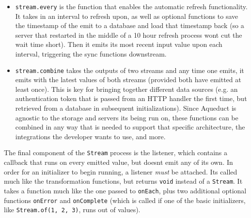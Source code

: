 \documentclass[manuscript,review,anonymous]{acmart}
\begin{document}
\begin{itemize}
  \begin{itemize}
  \tightlist
  \item
    Adding a \texttt{console.log} that prints on each event is essential
    while debugging if something in the chain is going wrong.
  \item
    If a developer wants to keep an external source up to date about
    things going on inside the chain, they can do it in an
    \texttt{onEach}. For example, a developer could add an
    \texttt{onEach} step after a login token has been exchanged, but
    before it\textquotesingle s been used for a web request, that saves
    it to a database (so that if the server were to restart, the user
    wouldn\textquotesingle t have to log back in).
  \end{itemize}
\item
  \texttt{stream.every} is the function that enables the automatic
  refresh functionality. It takes in an interval to refresh upon, as
  well as optional functions to save the timestamp of the emit to a
  database and load that timestamp back (so a server that restarted in
  the middle of a 10 hour refresh process won\textquotesingle t cut the
  wait time short). Then it emits its most recent input value upon each
  interval, triggering the sync functions downstream.
\item
  \texttt{stream.combine} takes the outputs of two streams and any time
  one emits, it emits with the latest values of both streams (provided
  both have emitted at least once). This is key for bringing together
  different data sources (e.g. an authentication token that is passed
  from an HTTP handler the first time, but retrieved from a database in
  subsequent initializations). Since Aqueduct is agnostic to the storage
  and servers it\textquotesingle s being run on, these functions can be
  combined in any way that is needed to support that specific
  architecture, the integrations the developer wants to use, and more.
\end{itemize}

The final component of the \texttt{Stream} process is the listener,
which contains a callback that runs on every emitted value, but
doesn\textquotesingle t emit any of its own. In order for an initializer
to begin running, a listener \emph{must} be attached.
It\textquotesingle s called much like the transformation functions, but
returns \texttt{void} instead of a \texttt{Stream}. It takes a function
much like the one passed to \texttt{onEach}, plus two additional
optional functions \texttt{onError} and \texttt{onComplete} (which is
called if one of the basic initializers, like
\texttt{Stream.of(1,\ 2,\ 3)}, runs out of values).
\end{document}
